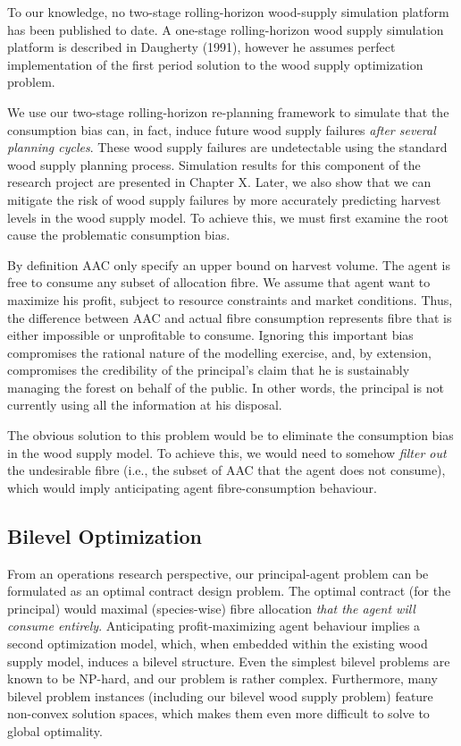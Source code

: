 To our knowledge, no two-stage rolling-horizon wood-supply simulation platform has been published to date. A one-stage rolling-horizon wood supply simulation platform is described in Daugherty (1991), however he assumes perfect implementation of the first period solution to the wood supply optimization problem.

We use our two-stage rolling-horizon re-planning framework to simulate that the consumption bias can, in fact, induce future wood supply failures \emph{after several planning cycles}. These wood supply failures are undetectable using the standard wood supply planning process. Simulation results for this component of the research project are presented in Chapter X. Later, we also show that we can mitigate the risk of wood supply failures by more accurately predicting harvest levels in the wood supply model. To achieve this, we must first examine the root cause the problematic consumption bias.

By definition AAC only specify an upper bound on harvest volume. The agent is free to consume any subset of allocation fibre. We assume that agent want to maximize his profit, subject to resource constraints and market conditions. Thus, the difference between AAC and actual fibre consumption represents fibre that is either impossible or unprofitable to consume. Ignoring this important bias compromises the rational nature of the modelling exercise, and, by extension, compromises the credibility of the principal's claim that he is sustainably managing the forest on behalf of the public. In other words, the principal is not currently using all the information at his disposal.

The obvious solution to this problem would be to eliminate the consumption bias in the wood supply model. To achieve this, we would need to somehow \emph{filter out} the undesirable fibre (i.e., the subset of AAC that the agent does not consume), which would imply anticipating agent fibre-consumption behaviour.

\subsection{Bilevel Optimization}

From an operations research perspective, our principal-agent problem can be formulated as an optimal contract design problem. The optimal contract (for the principal) would maximal (species-wise) fibre allocation \emph{that the agent will consume entirely}. Anticipating profit-maximizing agent behaviour implies a second optimization model, which, when embedded within the existing wood supply model, induces a bilevel structure. Even the simplest bilevel problems are known to be NP-hard, and our problem is rather complex. Furthermore, many bilevel problem instances (including our bilevel wood supply problem) feature non-convex solution spaces, which makes them even more difficult to solve to global optimality. 

